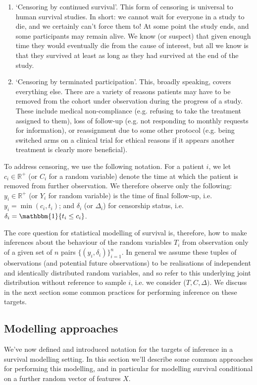 \documentclass[../thesis.tex]{subfiles}
\begin{document}
\begin{enumerate}
    \item `Censoring by continued survival'. This form of censoring is universal to human survival studies. In short: we cannot wait for everyone in a study to die, and we certainly can't force them to! At some point the study ends, and some participants may remain alive. We know (or suspect) that given enough time they would eventually die from the cause of interest, but all we know is that they survived at least as long as they had survived at the end of the study.
    \item `Censoring by terminated participation'. This, broadly speaking, covers everything else. There are a variety of reasons patients may have to be removed from the cohort under observation during the progress of a study. These include medical non-compliance (e.g. refusing to take the treatment assigned to them), loss of follow-up (e.g. not responding to monthly requests for information), or reassignment due to some other protocol (e.g. being switched arms on a clinical trial for ethical reasons if it appears another treatment is clearly more beneficial).
\end{enumerate}

To address censoring, we use the following notation. For a patient $i$, we let $c_i \in \mathbb{R}^{+}$ (or $C_i$ for a random variable) denote the time at which the patient is removed from further observation. We therefore observe only the following: $y_i \in \mathbb{R}^{+}$ (or $Y_i$ for random variable) is the time of final follow-up, i.e. $y_i = \min(c_i, t_i)$; and $\delta_i$ (or $\Delta_i$) for censorship status, i.e. $\delta_i = \mathbbm{1}\{t_i \leq c_i\}$. 

The core question for statistical modelling of survival is, therefore, how to make inferences about the behaviour of the random variables $T_i$ from observation only of a given set of $n$ pairs $\{(y_i, \delta_i)\}_{i=1}^{n}$. In general we assume these tuples of observations (and potential future observations) to be realisations of independent and identically distributed random variables, and so refer to this underlying joint distribution without reference to sample $i$, i.e. we consider ($T, C, \Delta)$.  We discuss in the next section some common practices for performing inference on these targets.
   
\subsection{Modelling approaches}
We've now defined and introduced notation for the targets of inference in a survival modelling setting. In this section we'll describe some common approaches for performing this modelling, and in particular for modelling survival conditional on a further random vector of features $X$. 
\end{document}
